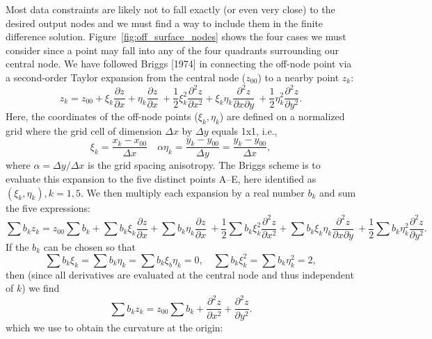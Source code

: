 \documentclass[12pt,letterpaper,margin=0.5in]{article}
\begin{document}
Most data constraints are likely not to fall exactly (or even very close) to the
desired output nodes and we must find a way to include them in the finite difference
solution.  Figure~\ref{fig:off_surface_nodes} shows the four cases we must consider since
a point may fall into any of the four quadrants surrounding our central node.
We have followed Briggs [1974] in connecting the off-node point via a
second-order Taylor expansion from the central node ($z_{00}$) to a nearby point $z_k$:
\begin{equation}
	z_k = z_{00} + \xi_k \frac{\partial z}{\partial x} + \eta_k \frac{\partial z}{\partial x} \
	+ \frac{1}{2} \xi^2_k \frac{\partial^2 z}{\partial x^2} + \xi_k \eta_k \frac{\partial^2 z}{\partial x \partial y} \
	+ \frac{1}{2}  \eta^2_k \frac{\partial^2 z}{\partial y^2}.
\end{equation}
Here, the coordinates of the off-node points ($\xi_k, \eta_k$) are defined on a normalized
grid where the grid cell of dimension $\Delta x$ by $\Delta y$ equals 1x1, i.e.,
\begin{equation}
\xi_k = \frac{x_k-x_{00}}{\Delta x} \quad \alpha \eta_k = \frac{y_k-y_{00}}{\Delta y} = \frac{y_k-y_{00}}{\Delta x},
\end{equation}
where $\alpha = \Delta y/ \Delta x$ is the grid spacing anisotropy.
The Briggs scheme is to evaluate this expansion to the five distinct points A--E, here identified as $(\xi_k, \eta_k), k = 1,5$.
We then multiply each expansion by a real number $b_k$ and sum the five expressions:
\begin{equation}
	\sum b_k z_k = z_{00}\sum b_k  + \sum b_k \xi_k \frac{\partial z}{\partial x} + \sum b_k \eta_k \frac{\partial z}{\partial x} \
	+ \frac{1}{2} \sum b_k \xi^2_k \frac{\partial^2 z}{\partial x^2} + \sum b_k \xi_k \eta_k \frac{\partial^2 z}{\partial x \partial y} \
	+ \frac{1}{2} \sum b_k \eta^2_k \frac{\partial^2 z}{\partial y^2}.
\end{equation}
If the $b_k$ can be chosen so that
\begin{equation}
\sum b_k \xi_k = \sum b_k \eta_k = \sum b_k \xi_b \eta_k = 0, \quad \sum b_k \xi^2_k = \sum b_k \eta^2_k = 2,
\label{eq:define}
\end{equation}
then (since all derivatives are evaluated at the central node and thus independent of $k$) we find
\begin{equation}
	\sum b_k z_k = z_{00}\sum b_k  + \frac{\partial^2 z}{\partial x^2} + \frac{\partial^2 z}{\partial y^2}.
\end{equation}
which we use to obtain the curvature at the origin:
\end{document}
